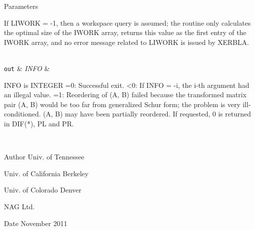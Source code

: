 \begin{DoxyParams}[1]{Parameters}
\begin{DoxyVerb}
          If LIWORK = -1, then a workspace query is assumed; the
          routine only calculates the optimal size of the IWORK array,
          returns this value as the first entry of the IWORK array, and
          no error message related to LIWORK is issued by XERBLA.\end{DoxyVerb}
\\
\hline
\mbox{\tt out}  & {\em I\+N\+F\+O} & \begin{DoxyVerb}          INFO is INTEGER
            =0: Successful exit.
            <0: If INFO = -i, the i-th argument had an illegal value.
            =1: Reordering of (A, B) failed because the transformed
                matrix pair (A, B) would be too far from generalized
                Schur form; the problem is very ill-conditioned.
                (A, B) may have been partially reordered.
                If requested, 0 is returned in DIF(*), PL and PR.\end{DoxyVerb}
 \\
\hline
\end{DoxyParams}
\begin{DoxyAuthor}{Author}
Univ. of Tennessee 

Univ. of California Berkeley 

Univ. of Colorado Denver 

N\+A\+G Ltd. 
\end{DoxyAuthor}
\begin{DoxyDate}{Date}
November 2011 
\end{DoxyDate}
